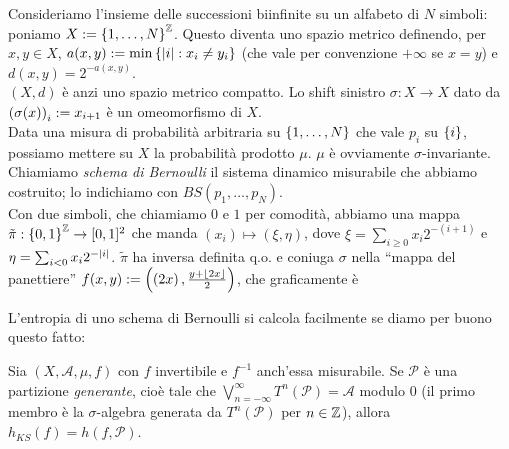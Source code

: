 \begin{esempio}Consideriamo l'insieme delle successioni biinfinite su un alfabeto di $N$ simboli: poniamo $X:=\left\{1,\dots,N\right\}^{\mathbb{Z}}$.
Questo diventa uno spazio metrico definendo, per $x,y\in X$, $a(x,y):=\min\left\{\left|i\right|:x_i\neq y_i\right\}$ (che vale per convenzione $+\infty$
se $x=y$) e $d(x,y)=2^{-a(x,y)}$. \\
$(X,d)$ è anzi uno spazio metrico compatto. Lo shift sinistro $\sigma:X\to X$ dato da $\left(\sigma(x)\right)_i:=x_{i+1}$ è un omeomorfismo di $X$. \\
Data una misura di probabilità arbitraria su $\left\{1,\dots,N\right\}$ che vale $p_i$ su $\left\{i\right\}$, possiamo mettere su $X$
la probabilità prodotto $\mu$. $\mu$ è ovviamente $\sigma$-invariante. \\
Chiamiamo \emph{schema di Bernoulli} il sistema dinamico misurabile che abbiamo costruito; lo indichiamo con $BS(p_1,\dots,p_N)$. \\
Con due simboli, che chiamiamo $0$ e $1$ per comodità, abbiamo una mappa $\tilde{\pi}:\left\{0,1\right\}^{\mathbb{Z}}\to [0,1]^2$
che manda $(x_i)\mapsto (\xi,\eta)$, dove $\xi=\sum_{i\ge 0}x_i 2^{-(i+1)}$ e $\eta=\sum_{i<0}x_i 2^{-\left|i\right|}$.
$\tilde{\pi}$ ha inversa definita q.o. e coniuga $\sigma$ nella ``mappa del panettiere'' $f(x,y):=\left(\left(2x\right),\frac{y+\left\lfloor 2x\right\rfloor}{2}\right)$,
che graficamente è

\begin{center}\end{center}
\end{esempio}

L'entropia di uno schema di Bernoulli si calcola facilmente se diamo per buono questo fatto:

\begin{teo}Sia $(X,\mathcal{A},\mu,f)$ con $f$ invertibile e $f^{-1}$ anch'essa misurabile.
Se $\mathcal{P}$ è una partizione \emph{generante}, cioè tale che $\bigvee_{n=-\infty}^\infty T^n(\mathcal{P})=\mathcal{A}$ modulo $0$
(il primo membro è la $\sigma$-algebra generata da $T^n(\mathcal{P})$ per $n\in\mathbb{Z}$), allora $h_{KS}(f)=h(f,\mathcal{P})$.
\end{teo}

